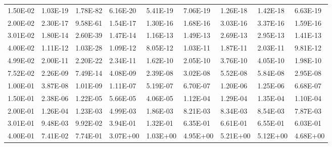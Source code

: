 \begin{table}
\begin{center}
\begin{threeparttable}
\begin{tabular}{@{}lllllllll@{}}
1.50E-02 & 1.03E-19                & 1.78E-82                 & 6.16E-20                & 5.41E-19                & 7.06E-19          & 1.26E-18                  & 1.42E-18                & 6.63E-19                  \\
2.00E-02 & 2.30E-17                & 9.58E-61                 & 1.54E-17                & 1.30E-16                & 1.68E-16          & 3.03E-16                  & 3.37E-16                & 1.59E-16                  \\
3.01E-02 & 1.80E-14                & 2.60E-39                 & 1.47E-14                & 1.16E-13                & 1.49E-13          & 2.69E-13                  & 2.95E-13                & 1.41E-13                  \\
4.00E-02 & 1.11E-12                & 1.03E-28                 & 1.09E-12                & 8.05E-12                & 1.03E-11          & 1.87E-11                  & 2.03E-11                & 9.81E-12                  \\
4.99E-02 & 2.00E-11                & 2.20E-22                 & 2.34E-11                & 1.62E-10                & 2.05E-10          & 3.76E-10                  & 4.05E-10                & 1.98E-10                  \\
7.52E-02 & 2.26E-09                & 7.49E-14                 & 4.08E-09                & 2.39E-08                & 3.02E-08          & 5.52E-08                  & 5.84E-08                & 2.95E-08                  \\
1.00E-01 & 3.87E-08                & 1.01E-09                 & 1.11E-07                & 5.19E-07                & 6.70E-07          & 1.20E-06                  & 1.25E-06                & 6.68E-07                  \\
1.50E-01 & 2.38E-06                & 1.22E-05                 & 5.66E-05                & 4.06E-05                & 1.12E-04          & 1.29E-04                  & 1.35E-04                & 1.10E-04                  \\
2.00E-01 & 1.26E-04                & 1.23E-03                 & 4.99E-03                & 1.86E-03                & 8.21E-03          & 8.34E-03                  & 8.54E-03                & 7.87E-03                  \\
3.01E-01 & 9.48E-03                & 9.92E-02                 & 3.94E-01                & 1.32E-01                & 6.35E-01          & 6.61E-01                  & 6.55E-01                & 6.03E-01                  \\
4.00E-01 & 7.41E-02                & 7.74E-01                 & 3.07E+00                & 1.03E+00                & 4.95E+00          & 5.21E+00                  & 5.12E+00                & 4.68E+00                  \\

\end{tabular}
\end{threeparttable}
\end{center}
\end{table}
